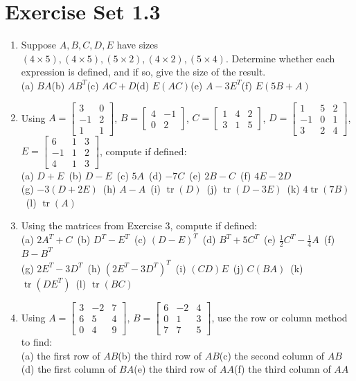 \documentclass{article}
\theoremstyle{mystyle}
\begin{document}
\section*{Exercise Set 1.3}
\begin{enumerate}
    \item[1.] Suppose $A,B,C,D,E$ have sizes $(4\times5),(4\times5),(5\times2),(4\times2),(5\times4)$. Determine whether each expression is defined, and if so, give the size of the result.\\
    (a) $BA$\quad (b) $AB^T$\quad (c) $AC+D$\quad (d) $E(AC)$\quad (e) $A-3E^T$\quad (f) $E(5B+A)$

    \item[3.] Using $A=\begin{bmatrix}3&0\\-1&2\\1&1\end{bmatrix}$, $B=\begin{bmatrix}4&-1\\0&2\end{bmatrix}$, $C=\begin{bmatrix}1&4&2\\3&1&5\end{bmatrix}$, $D=\begin{bmatrix}1&5&2\\-1&0&1\\3&2&4\end{bmatrix}$, $E=\begin{bmatrix}6&1&3\\-1&1&2\\4&1&3\end{bmatrix}$, compute if defined:\\
    (a) $D+E$\ (b) $D-E$\ (c) $5A$\ (d) $-7C$\ (e) $2B-C$\ (f) $4E-2D$\\
    (g) $-3(D+2E)$\ (h) $A-A$\ (i) $\operatorname{tr}(D)$\ (j) $\operatorname{tr}(D-3E)$\ (k) $4\operatorname{tr}(7B)$\ (l) $\operatorname{tr}(A)$

    \item[4.] Using the matrices from Exercise 3, compute if defined:\\
    (a) $2A^T+C$\ (b) $D^T-E^T$\ (c) $(D-E)^T$\ (d) $B^T+5C^T$\ (e) $\tfrac12C^T-\tfrac14A$\ (f) $B-B^T$\\
    (g) $2E^T-3D^T$\ (h) $(2E^T-3D^T)^T$\ (i) $(CD)E$\ (j) $C(BA)$\ (k) $\operatorname{tr}(DE^T)$\ (l) $\operatorname{tr}(BC)$

    \item[7.] Using $A=\begin{bmatrix}3&-2&7\\6&5&4\\0&4&9\end{bmatrix}$, $B=\begin{bmatrix}6&-2&4\\0&1&3\\7&7&5\end{bmatrix}$, use the row or column method to find:\\
    (a) the first row of $AB$\quad (b) the third row of $AB$\quad (c) the second column of $AB$\\
    (d) the first column of $BA$\quad (e) the third row of $AA$\quad (f) the third column of $AA$


\end{enumerate}
\end{document}
